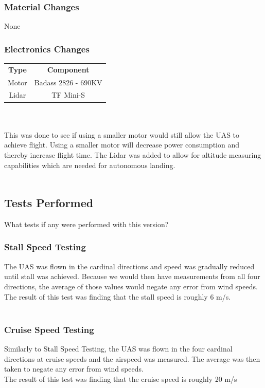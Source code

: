 \documentclass{article}
\begin{document}
\subsubsection*{Material Changes}
None \\

\subsubsection*{Electronics Changes}
\begin{tabular}{ c c }
	\textbf{Type} & \textbf{Component}  \\ 
	Motor & Badass 2826 - 690KV \\
	Lidar & TF Mini-S
\end{tabular} \\ \\
This was done to see if using a smaller motor would still allow the UAS to achieve flight. Using a smaller motor will decrease power consumption and thereby increase flight time. The Lidar was added to allow for altitude measuring capabilities which are needed for autonomous landing. \\ \\

\subsection*{Tests Performed}
What tests if any were performed with this version?
\subsubsection*{Stall Speed Testing}
The UAS was flown in the cardinal directions and speed was gradually reduced until stall was achieved. Because we would then have measurements from all four directions, the average of those values would negate any error from wind speeds. \\
The result of this test was finding that the stall speed is roughly 6 m/s. \\ \\
\subsubsection*{Cruise Speed Testing}
Similarly to Stall Speed Testing, the UAS was flown in the four cardinal directions at cruise speeds and the airspeed was measured. The average was then taken to negate any error from wind speeds. \\
The result of this test was finding that the cruise speed is roughly 20 m/s \\ \\
\end{document}
